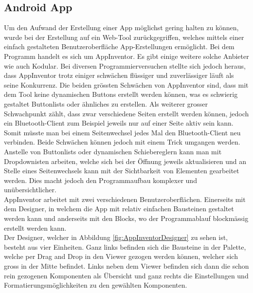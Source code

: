 \subsection{Android App}
\label{subsec:Software_App}

Um den Aufwand der Erstellung einer App möglichst gering halten zu können, wurde bei der Erstellung auf ein Web-Tool zurückgegriffen, welches mittels einer einfach gestalteten Benutzeroberfläche App-Erstellungen ermöglicht. Bei dem Programm handelt es sich um AppInventor. Es gibt einige weitere solche Anbieter wie auch Kodular. Bei diversen Programmierversuchen stellte sich jedoch heraus, dass AppInventor trotz einiger schwächen flüssiger und zuverlässiger läuft als seine Konkurrenz.  Die beiden grössten Schwächen von AppInventor sind, dass mit dem Tool keine dynamischen Buttons erstellt werden können, was es schwierig gestaltet Buttonlists oder ähnliches zu erstellen. Als weiterer grosser Schwachpunkt zählt, dass zwar verschiedene Seiten erstellt werden können, jedoch ein Bluetooth-Client zum Beispiel jeweils nur auf einer Seite aktiv sein kann. Somit müsste man bei einem Seitenwechsel jedes Mal den Bluetooth-Client neu verbinden. Beide Schwächen können jedoch mit einem Trick umgangen werden. Anstelle von Buttonlists oder dynamischen Schiebereglern kann man mit Dropdownisten arbeiten, welche sich bei der Öffnung jeweils aktualisieren und an Stelle eines Seitenwechsels kann mit der Sichtbarkeit von Elementen gearbeitet werden. Dies macht jedoch den Programmaufbau komplexer und unübersichtlicher. \cite{appinventor_mit_nodate} \cite{kodular_kodular_nodate} \\


AppInventor arbeitet mit zwei verschiedenen Benutzeroberflächen. Einerseits mit dem Designer, in welchem die App mit relativ einfachen Bausteinen gestaltet werden kann und anderseits mit den Blocks, wo der Programmablauf blockmässig erstellt werden kann.\\

Der Designer, welcher in Abbildung \ref{fig:AppInventorDesigner} zu sehen ist, besteht aus vier Einheiten. Ganz links befinden sich die Bausteine in der Palette, welche per Drag and Drop in den Viewer gezogen werden können, welcher sich gross in der Mitte befindet. Links neben dem Viewer befinden sich dann die schon rein gezogenen Komponenten als Übersicht und ganz rechts die Einstellungen und Formatierungsmöglichkeiten zu den gewählten Komponenten.

\newpage

